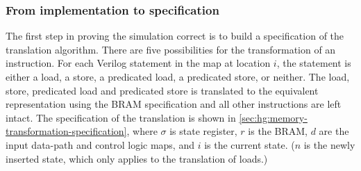 \subsubsection{From implementation to specification}

The first step in proving the simulation correct is to build a specification of
the translation algorithm.  There are five possibilities for the transformation
of an instruction. For each Verilog statement in the map at location $i$, the
statement is either a load, a store, a predicated load, a predicated store, or
neither. The load, store, predicated load and predicated store is translated to
the equivalent representation using the \gls{BRAM} specification and all other
instructions are left intact.  The specification of the translation is shown in
\cref{sec:hg:memory-transformation-specification}, where $\sigma$ is state
register, $r$ is the \gls{BRAM}, $d$ are the input data-path and control logic maps,
and $i$ is the current state.  ($n$ is the newly inserted state, which only
applies to the translation of loads.)

\newcommand\nonblockasgn{\mathrel{\texttt{<=}}}
\newcommand\blockasgn{\mathrel{\texttt{=}}}
\newcommand\msemi{\texttt{;}\ }
\newcommand\mternary[3]{#1\mathbin{\texttt{?}}#2\mathbin{\texttt{:}}#3}
\newcommand\mxor{\oplus}
\newcommand\verilogeq{\mathbin{\texttt{==}}}


